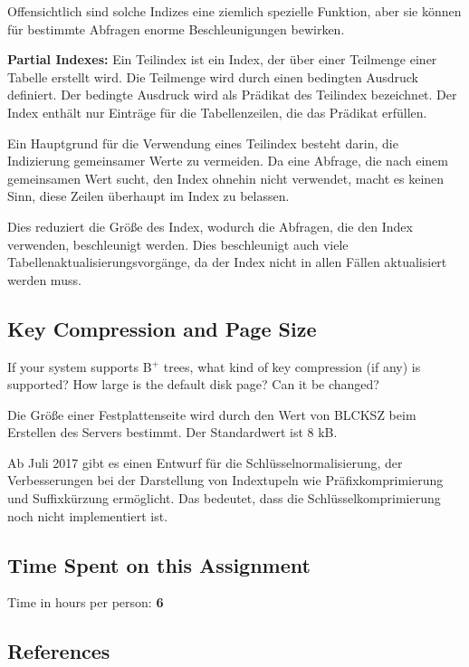 \documentclass[11pt]{scrartcl}
\begin{document}
Offensichtlich sind solche Indizes eine ziemlich spezielle Funktion, aber sie können für bestimmte Abfragen enorme Beschleunigungen bewirken.

\textbf{Partial Indexes:} Ein Teilindex ist ein Index, der über einer Teilmenge einer Tabelle erstellt wird. Die Teilmenge wird durch einen bedingten Ausdruck definiert. Der bedingte Ausdruck wird als Prädikat des Teilindex bezeichnet. Der Index enthält nur Einträge für die Tabellenzeilen, die das Prädikat erfüllen.

Ein Hauptgrund für die Verwendung eines Teilindex besteht darin, die Indizierung gemeinsamer Werte zu vermeiden. Da eine Abfrage, die nach einem gemeinsamen Wert sucht, den Index ohnehin nicht verwendet, macht es keinen Sinn, diese Zeilen überhaupt im Index zu belassen.

Dies reduziert die Größe des Index, wodurch die Abfragen, die den Index verwenden, beschleunigt werden. Dies beschleunigt auch viele Tabellenaktualisierungsvorgänge, da der Index nicht in allen Fällen aktualisiert werden muss.

\subsection{Key Compression and Page Size}

If your system supports B$^+$ trees, what kind of key compression (if any) is supported? How large is the default disk page? Can it be changed?

Die Größe einer Festplattenseite wird durch den Wert von BLCKSZ beim Erstellen des Servers bestimmt.
Der Standardwert ist 8 kB.

Ab Juli 2017 gibt es einen Entwurf für die Schlüsselnormalisierung, der Verbesserungen bei der Darstellung von Indextupeln wie Präfixkomprimierung und Suffixkürzung ermöglicht. Das bedeutet, dass die Schlüsselkomprimierung noch nicht implementiert ist.



\subsection*{Time Spent on this Assignment}

Time in hours per person: \textbf{6}

\subsection*{References}
\end{document}
